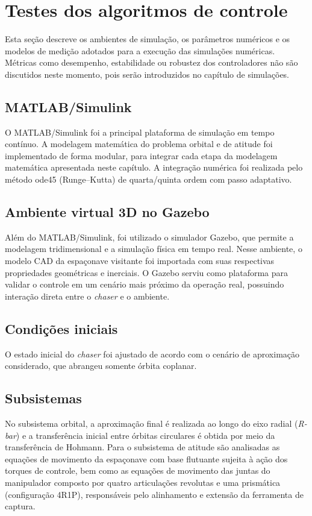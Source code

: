 \section{Testes dos algoritmos de controle}

Esta seção descreve os ambientes de simulação, os parâmetros numéricos e os modelos de medição adotados para a execução das simulações numéricas.
Métricas como desempenho, estabilidade ou robustez dos controladores não são discutidos neste momento, pois serão introduzidos no capítulo de simulações.

\subsection{MATLAB/Simulink}
O MATLAB/Simulink foi a principal plataforma de simulação em tempo contínuo. 
A modelagem matemática do problema orbital e de atitude foi implementado de forma modular, para integrar cada etapa da modelagem matemática apresentada neste capítulo.
A integração numérica foi realizada pelo método ode45 (Runge--Kutta) de quarta/quinta ordem com passo adaptativo. 

\subsection{Ambiente virtual 3D no Gazebo}
Além do MATLAB/Simulink, foi utilizado o simulador Gazebo, que permite a modelagem tridimensional e a simulação física em tempo real. 
Nesse ambiente, o modelo CAD da espaçonave visitante foi importada com suas respectivas propriedades geométricas e inerciais. 
O Gazebo serviu como plataforma para validar o controle em um cenário mais próximo da operação real, possuindo interação direta entre o \emph{chaser} e o ambiente.

\subsection{Condições iniciais}
O estado inicial do \emph{chaser} foi ajustado de acordo com o cenário de aproximação considerado, que abrangeu somente órbita coplanar.

\subsection{Subsistemas}
No subsistema orbital, a aproximação final é realizada ao longo do eixo radial (\emph{R-bar}) e a transferência inicial entre órbitas circulares é obtida por meio da transferência de Hohmann.  
Para o subsistema de atitude são analisadas as equações de movimento da espaçonave com base flutuante sujeita à ação dos torques de controle, bem como as equações de movimento das juntas do manipulador composto por quatro articulações revolutas e uma prismática (configuração 4R1P), responsáveis pelo alinhamento e extensão da ferramenta de captura.

